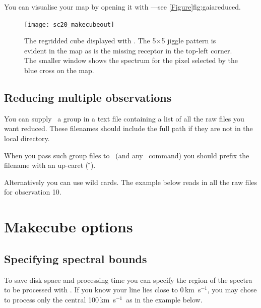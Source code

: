 \documentclass[11pt,oneside,chapters]{starlink}
\newcommand{\kms}{\mbox{$\,$km~s$^{-1}$}}   %
\newcommand{\kms}{\,km~s$^{-1}$}   %
\begin{document}
You can visualise your map by opening it with \gaia---see
\cref{Figure}{fig:gaiareduced}{}.

\begin{figure}[t!]
\begin{center}
\texttt{[image: sc20\_makecubeout]}
\caption[A regridded cube produced with \makecube.]{\label{fig:gaiareduced}
  The regridded cube displayed with \gaia. The 5$\times$5 jiggle
  pattern is evident in the map as is the missing receptor in the
  top-left corner. The smaller window shows the spectrum for the pixel
  selected by the blue cross on the map.}
\end{center}
\end{figure}

\subsection{Reducing multiple observations}

You can supply \makecube\ a group in a text file containing a list of
all the raw files you want reduced. These filenames should include the
full path if they are not in the local directory.

When you pass such group files to \makecube\ (and any \starlink\ command)
you should prefix the filename with an up-caret (\,\^\,).
\begin{terminalv}
\end{terminalv}

Alternatively you can use wild cards. The example below reads in all
the raw files for observation 10.
\begin{terminalv}
\end{terminalv}


\section{Makecube options}

\subsection{Specifying spectral bounds}

To save disk space and processing time you can specify the region of
the spectra to be processed with . If you know your
line lies close to 0\kms, you may chose to process only the central
100\kms\ as in the example below.
\begin{terminalv}
\end{terminalv}
\end{document}
